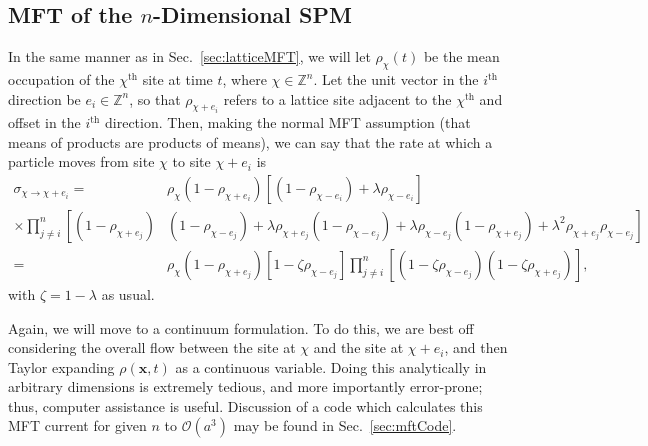 \subsection{MFT of the $n$-Dimensional SPM} \label{sec:nDMftDeriv}
In the same manner as in Sec.~\ref{sec:latticeMFT}, we will let $\rho_\chi (t)$ be the mean occupation of the $\chi^\mathrm{th}$ site
at time $t$, where $\chi \in \mathbb{Z}^n$. Let the unit vector in the $i^\mathrm{th}$
direction be $e_i \in \mathbb{Z}^n$, so that $\rho_{\chi+e_i}$ refers to a lattice site adjacent to the $\chi^\mathrm{th}$ and offset in the $i^\mathrm{th}$ direction. Then,
making the normal MFT assumption (that means of products are products of means),
we can say that the rate at which a particle moves from site $\chi$ to site $\chi+e_i$ is
\begin{equation}
\begin{aligned}
 \sigma_{\chi \rightarrow \chi + e_i} =& \rho_\chi (1 - \rho_{\chi+e_i}) \left[ \left( 1- \rho_{\chi-e_i} \right) + \lambda \rho_{\chi-e_i} \right] \\
 \times \prod_{j \ne i}^n \left[  (1-\rho_{\chi+e_j})\right.&\left.(1-\rho_{\chi-e_j}) + \lambda\rho_{\chi+e_j}(1-\rho_{\chi-e_j}) + \lambda \rho_{\chi-e_j}(1-\rho_{\chi+e_j}) + \lambda^2 \rho_{\chi+e_j}\rho_{\chi-e_j} \right] \\
   =& \rho_\chi \left( 1 -  \rho_{\chi+e_j} \right) \left[ 1 - \zeta \rho_{\chi-e_j} \right] \prod_{j \ne i}^n 
   \left[ (1-\zeta\rho_{\chi- e_j})(1-\zeta \rho_{\chi+e_j}) \right],
\end{aligned}
\end{equation}
with $\zeta = 1 - \lambda$ as usual.

Again, we will move to a continuum formulation. To do this, we are best off considering the overall flow
between the site at $\chi$ and the site at $\chi+e_i$, and then Taylor expanding $\rho(\mathbf{x}, t)$ as a continuous
variable. Doing this analytically in arbitrary dimensions is extremely tedious, and more importantly error-prone; thus, computer assistance is useful. Discussion of a code which calculates this MFT current for given 
$n$
to $\mathcal{O}(a^3)$ may be found in Sec.~\ref{sec:mftCode}.

